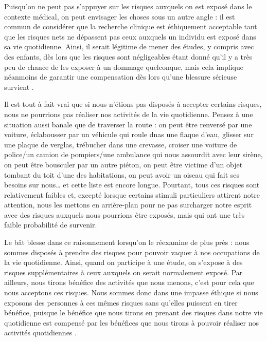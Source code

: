 \documentclass[
  12pt,
]{book}
\begin{document}
Puisqu'on ne peut pas s'appuyer sur les risques auxquels on est exposé dans le contexte médical, on peut envisager les choses sous un autre angle : il est commun de considérer que la recherche clinique est éthiquement acceptable tant que les risques nets ne dépassent pas ceux auxquels un individu est exposé dans sa vie quotidienne. Ainsi, il serait légitime de mener des études, y compris avec des enfants, dès lors que les risques sont négligeables étant donné qu'il y a très peu de chance de les exposer à un dommage quelconque, mais cela implique néanmoins de garantir une compensation dès lors qu'une blessure sérieuse survient \citep{VanEys1978-VANROC-10}.

Il est tout à fait vrai que si nous n'étions pas disposés à accepter certains risques, nous ne pourrions pas réaliser nos activités de la vie quotidienne. Pensez à une situation aussi banale que de traverser la route : on peut être renversé par une voiture, éclabousser par un véhicule qui roule dnas une flaque d'eau, glisser sur une plaque de verglas, trébucher dans une crevasse, croiser une voiture de police/un camion de pompiers/une ambulance qui nous assourdit avec leur sirène, on peut être bousculer par un autre piéton, on peut être victime d'un objet tombant du toit d'une des habitations, on peut avoir un oiseau qui fait ses besoins sur nous\ldots{} et cette liste est encore longue. Pourtant, tous ces risques sont relativement faibles et, excepté lorsque certains stimuli particuliers attirent notre attention, nous les mettons en arrière-plan pour ne pas surcharger notre esprit avec des risques auxquels nous pourrions être exposés, mais qui ont une très faible probabilité de survenir.

Le bât blesse dans ce raisonnement lorsqu'on le réexamine de plus près : nous sommes disposés à prendre des risques pour pouvoir vaquer à nos occupations de la vie quotidienne. Ainsi, quand on participe à une étude, on s'expose à des risques supplémentaires à ceux auxquels on serait normalement exposé. Par ailleurs, nous tirons bénéfice des activités que nous menons, c'est pour cela que nous acceptons ces risques. Nous sommes donc dans une impasse éthique si nous exposons des personnes à ces mêmes risques sans qu'elles puissent en tirer bénéfice, puisque le bénéfice que nous tirons en prenant des risques dans notre vie quotidienne est compensé par les bénéfices que nous tirons à pouvoir réaliser nos activités quotidiennes \citep{Friedman2006}.
\end{document}
